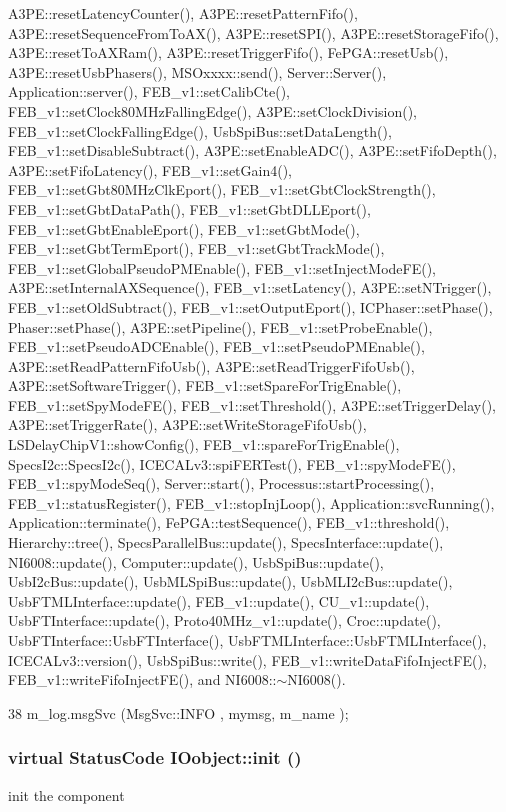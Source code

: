 A3PE::resetLatencyCounter(), A3PE::resetPatternFifo(), A3PE::resetSequenceFromToAX(), A3PE::resetSPI(), A3PE::resetStorageFifo(), A3PE::resetToAXRam(), A3PE::resetTriggerFifo(), FePGA::resetUsb(), A3PE::resetUsbPhasers(), MSOxxxx::send(), Server::Server(), Application::server(), FEB\_\-v1::setCalibCte(), FEB\_\-v1::setClock80MHzFallingEdge(), A3PE::setClockDivision(), FEB\_\-v1::setClockFallingEdge(), UsbSpiBus::setDataLength(), FEB\_\-v1::setDisableSubtract(), A3PE::setEnableADC(), A3PE::setFifoDepth(), A3PE::setFifoLatency(), FEB\_\-v1::setGain4(), FEB\_\-v1::setGbt80MHzClkEport(), FEB\_\-v1::setGbtClockStrength(), FEB\_\-v1::setGbtDataPath(), FEB\_\-v1::setGbtDLLEport(), FEB\_\-v1::setGbtEnableEport(), FEB\_\-v1::setGbtMode(), FEB\_\-v1::setGbtTermEport(), FEB\_\-v1::setGbtTrackMode(), FEB\_\-v1::setGlobalPseudoPMEnable(), FEB\_\-v1::setInjectModeFE(), A3PE::setInternalAXSequence(), FEB\_\-v1::setLatency(), A3PE::setNTrigger(), FEB\_\-v1::setOldSubtract(), FEB\_\-v1::setOutputEport(), ICPhaser::setPhase(), Phaser::setPhase(), A3PE::setPipeline(), FEB\_\-v1::setProbeEnable(), FEB\_\-v1::setPseudoADCEnable(), FEB\_\-v1::setPseudoPMEnable(), A3PE::setReadPatternFifoUsb(), A3PE::setReadTriggerFifoUsb(), A3PE::setSoftwareTrigger(), FEB\_\-v1::setSpareForTrigEnable(), FEB\_\-v1::setSpyModeFE(), FEB\_\-v1::setThreshold(), A3PE::setTriggerDelay(), A3PE::setTriggerRate(), A3PE::setWriteStorageFifoUsb(), LSDelayChipV1::showConfig(), FEB\_\-v1::spareForTrigEnable(), SpecsI2c::SpecsI2c(), ICECALv3::spiFERTest(), FEB\_\-v1::spyModeFE(), FEB\_\-v1::spyModeSeq(), Server::start(), Processus::startProcessing(), FEB\_\-v1::statusRegister(), FEB\_\-v1::stopInjLoop(), Application::svcRunning(), Application::terminate(), FePGA::testSequence(), FEB\_\-v1::threshold(), Hierarchy::tree(), SpecsParallelBus::update(), SpecsInterface::update(), NI6008::update(), Computer::update(), UsbSpiBus::update(), UsbI2cBus::update(), UsbMLSpiBus::update(), UsbMLI2cBus::update(), UsbFTMLInterface::update(), FEB\_\-v1::update(), CU\_\-v1::update(), UsbFTInterface::update(), Proto40MHz\_\-v1::update(), Croc::update(), UsbFTInterface::UsbFTInterface(), UsbFTMLInterface::UsbFTMLInterface(), ICECALv3::version(), UsbSpiBus::write(), FEB\_\-v1::writeDataFifoInjectFE(), FEB\_\-v1::writeFifoInjectFE(), and NI6008::$\sim$NI6008().


\begin{DoxyCode}
38 { m_log.msgSvc (MsgSvc::INFO    , mymsg, m_name ); }
\end{DoxyCode}
\hypertarget{classIOobject_ab989e175734dd73797343e63cec6b174}{
\subsubsection[{init}]{\setlength{\rightskip}{0pt plus 5cm}virtual {\bf StatusCode} IOobject::init ()}}
\label{classIOobject_ab989e175734dd73797343e63cec6b174}
init the component

